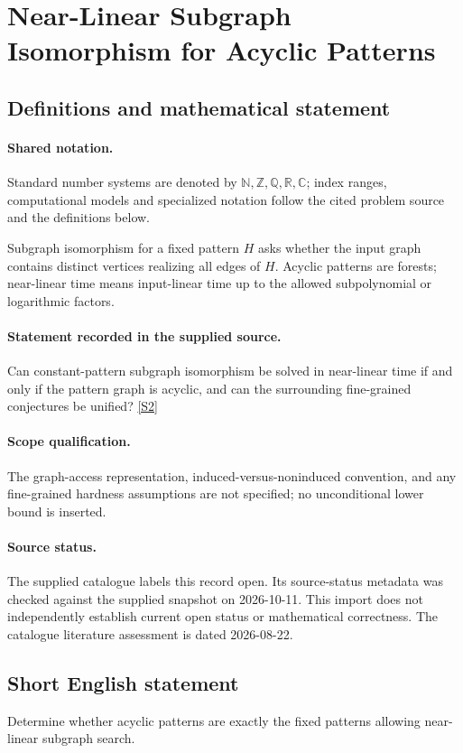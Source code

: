 \documentclass[11pt]{article}
\newcommand{\sref}[2]{\hyperlink{source:#1:#2}{[S#2]}}
\begin{document}
\section{Near-Linear Subgraph Isomorphism for Acyclic Patterns}\label{statement}

\subsection{Definitions and mathematical statement}

\paragraph{Shared notation.}Standard number systems are denoted by $\mathbb N,\mathbb Z,\mathbb Q,\mathbb R,\mathbb C$; index ranges, computational models and specialized notation follow the cited problem source and the definitions below.


Subgraph isomorphism for a fixed pattern $H$ asks whether the input graph contains distinct vertices realizing all edges of $H$. Acyclic patterns are forests; near-linear time means input-linear time up to the allowed subpolynomial or logarithmic factors.
\paragraph{Statement recorded in the supplied source.}
Can constant-pattern subgraph isomorphism be solved in near-linear time if and only if the pattern graph is acyclic, and can the surrounding fine-grained conjectures be unified? \sref{statement}{2}
\paragraph{Scope qualification.}
The graph-access representation, induced-versus-noninduced convention, and any fine-grained hardness assumptions are not specified; no unconditional lower bound is inserted.
\paragraph{Source status.}
The supplied catalogue labels this record open. Its source-status metadata was checked against the supplied snapshot on 2026-10-11. This import does not independently establish current open status or mathematical correctness. The catalogue literature assessment is dated 2026-08-22.
\subsection{Short English statement}
Determine whether acyclic patterns are exactly the fixed patterns allowing near-linear subgraph search.
\end{document}
